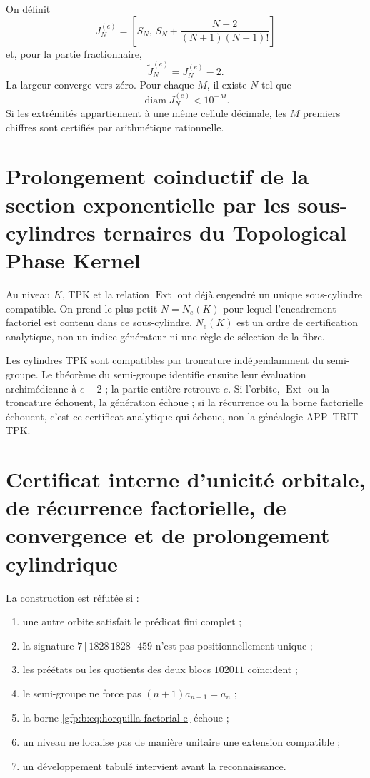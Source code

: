 On définit
\[
 J_N^{(e)}=
 \left[
 S_N,\,
 S_N+\frac{N+2}{(N+1)(N+1)!}
 \right]
\]
et, pour la partie fractionnaire,
\[
 \widetilde J_N^{(e)}=J_N^{(e)}-2.
\]
La largeur converge vers zéro. Pour chaque \(M\), il existe \(N\) tel que
\[
 \operatorname{diam}J_N^{(e)}<10^{-M}.
\]
Si les extrémités appartiennent à une même cellule décimale, les \(M\) premiers
chiffres sont certifiés par arithmétique rationnelle.

\section{Prolongement coinductif de la section exponentielle par les sous-cylindres ternaires du Topological Phase Kernel}

Au niveau \(K\), TPK et la relation \(\operatorname{Ext}\) ont déjà engendré
un unique sous-cylindre compatible. On prend le plus petit \(N=N_e(K)\) pour lequel
l’encadrement factoriel est contenu dans ce sous-cylindre. \(N_e(K)\) est un
ordre de certification analytique, non un indice générateur ni une règle de
sélection de la fibre.

Les cylindres TPK sont compatibles par troncature indépendamment du
semi-groupe. Le théorème du semi-groupe identifie ensuite leur évaluation
archimédienne à \(e-2\) ; la partie entière retrouve \(e\). Si l’orbite,
\(\operatorname{Ext}\) ou la troncature échouent, la génération échoue ; si la
récurrence ou la borne factorielle échouent, c’est ce certificat analytique qui échoue, non la
généalogie APP--TRIT--TPK.

\section{Certificat interne d’unicité orbitale, de récurrence factorielle, de convergence et de prolongement cylindrique}

\begin{remark}
La construction est réfutée si :
\begin{enumerate}
 \item une autre orbite satisfait le prédicat fini complet ;
 \item la signature \(7[1828\,1828]459\) n’est pas positionnellement unique ;
 \item les préétats ou les quotients des deux blocs \(102011\) coïncident ;
 \item le semi-groupe ne force pas \((n+1)a_{n+1}=a_n\) ;
 \item la borne \eqref{gfp:b:eq:horquilla-factorial-e} échoue ;
 \item un niveau ne localise pas de manière unitaire une extension compatible ;
 \item un développement tabulé intervient avant la reconnaissance.
\end{enumerate}
\end{remark}
